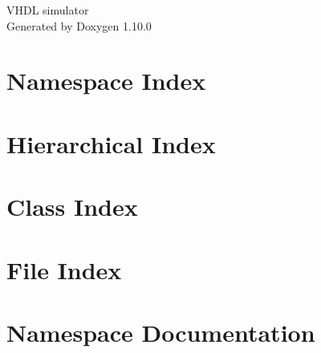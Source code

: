 \documentclass[twoside]{book}
\newcommand{\+}{\discretionary{\mbox{\scriptsize$\hookleftarrow$}}{}{}}
\newcommand{\clearemptydoublepage}{%
    \newpage{\pagestyle{empty}\cleardoublepage}%
  }
\begin{document}
  \raggedbottom
    \hypersetup{pageanchor=false,
                bookmarksnumbered=true,
                pdfencoding=unicode
               }
  \begin{titlepage}
  \vspace*{7cm}
  \begin{center}%
  {\Large VHDL simulator}\\
  \vspace*{1cm}
  {\large Generated by Doxygen 1.10.0}\\
  \end{center}
  \end{titlepage}
  \clearemptydoublepage
  \tableofcontents
  \clearemptydoublepage
  \hypersetup{pageanchor=true}
\chapter{Namespace Index}

\chapter{Hierarchical Index}

\chapter{Class Index}

\chapter{File Index}

\chapter{Namespace Documentation}















\end{document}
